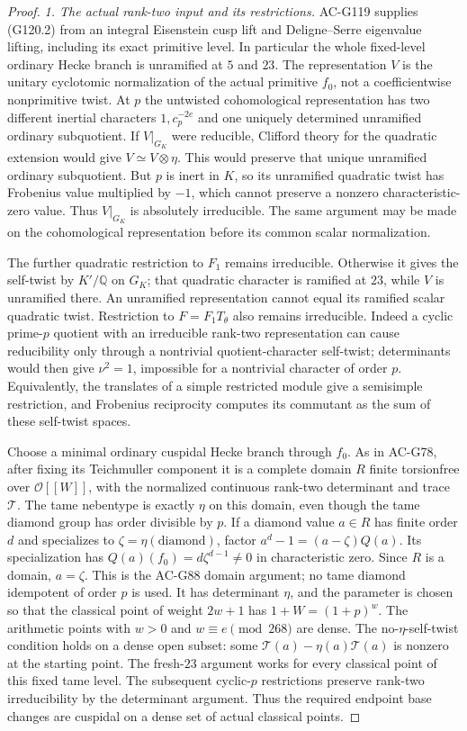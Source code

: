 \begin{proof}
\emph{1. The actual rank-two input and its restrictions.}
AC-G119 supplies (G120.2) from an integral Eisenstein cusp lift and
Deligne--Serre eigenvalue lifting, including its exact primitive level.
In particular the whole fixed-level ordinary Hecke branch is
unramified at $5$ and $23$.
The representation $V$ is the unitary cyclotomic normalization of
the actual primitive $f_0$, not a coefficientwise nonprimitive twist.
At $p$ the untwisted cohomological representation has two different
inertial characters $1,c_p^{-2e}$ and one uniquely determined
unramified ordinary subquotient.
If $V|_{G_K}$ were reducible, Clifford theory for the quadratic
extension would give $V\simeq V\otimes\eta$.
This would preserve that unique unramified ordinary subquotient.
But $p$ is inert in $K$, so its unramified quadratic twist has
Frobenius value multiplied by $-1$, which cannot preserve a nonzero
characteristic-zero value.  Thus $V|_{G_K}$ is absolutely irreducible.
The same argument may be made on the cohomological representation
before its common scalar normalization.

The further quadratic restriction to $F_1$ remains irreducible.
Otherwise it gives the self-twist by $K'/\mathbb Q$ on $G_K$;
that quadratic character is ramified at $23$, while $V$ is unramified
there.  An unramified representation cannot equal its ramified
scalar quadratic twist.  Restriction to $F=F_1T_\theta$ also remains
irreducible.  Indeed a cyclic prime-$p$ quotient with an irreducible
rank-two representation can cause reducibility only through a
nontrivial quotient-character self-twist; determinants would then
give $\nu^2=1$, impossible for a nontrivial character of order $p$.
Equivalently, the translates of a simple restricted module give a
semisimple restriction, and Frobenius reciprocity computes its
commutant as the sum of these self-twist spaces.

Choose a minimal ordinary cuspidal Hecke branch through $f_0$.
As in AC-G78, after fixing its Teichmuller component it is a complete
domain $R$ finite torsionfree over $\mathcal O[[W]]$, with the
normalized continuous rank-two determinant and trace $\mathcal T$.
The tame nebentype is exactly $\eta$ on this domain, even though
the tame diamond group has order divisible by $p$.  If a diamond
value $a\in R$ has finite order $d$ and specializes to
$\zeta=\eta(\text{diamond})$, factor
$a^d-1=(a-\zeta)Q(a)$.  Its specialization has
$Q(a)(f_0)=d\zeta^{d-1}\ne0$ in characteristic zero.
Since $R$ is a domain, $a=\zeta$.  This is the AC-G88
domain argument; no tame diamond idempotent of order $p$ is used.
It has determinant $\eta$, and the parameter is chosen so that the
classical point of weight $2w+1$ has $1+W=(1+p)^w$.
The arithmetic points with $w>0$ and $w\equiv e\pmod{268}$ are dense.
The no-$\eta$-self-twist condition holds on a dense open subset:
some $\mathcal T(a)-\eta(a)\mathcal T(a)$ is nonzero at the starting
point.  The fresh-$23$ argument works for every classical point of
this fixed tame level.  The subsequent cyclic-$p$ restrictions
preserve rank-two irreducibility by the determinant argument.
Thus the required endpoint base changes are cuspidal on a dense
set of actual classical points.


\end{proof}
